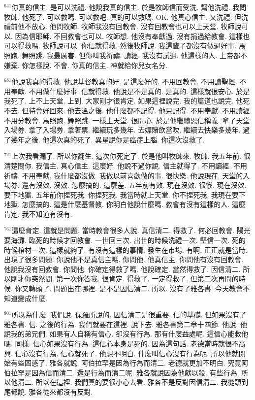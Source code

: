 \documentclass{book}
\begin{document}
$^{641}$你真的信主.
是可以洗禮.
他說我真的信主.
於是牧師信而受洗.
幫他洗禮.
我問牧師.
他死了.
可以救嗎.
可以救吧.
真的可以救嗎.
OK.
他真心信主.
又洗禮.
但洗禮前他不放心.
他問牧師.
牧師我沒有回教會.
沒有回教會也可以上天堂.
牧師說可以.
因為信耶穌.
不回教會也可以.
牧師想.
他沒有奉獻過.
沒有捐過給教會.
這樣也可以得救嗎.
牧師說可以.
你信就得救.
然後牧師說.
我這輩子都沒有做過好事.
馬照跑.
舞照跳.
我最厲害.
但你叫我祈禱.
讀經.
我沒有試過.
他這樣的人.
上帝都不嫌棄.
你怎樣說.
不會.
你真的信主.
神就給你兒女名分.

$^{681}$他說我真的得救.
他說基督教真的好.
是這麼好的.
不用回教會.
不用讀聖經.
不用奉獻.
不用做什麼好事.
信就得救.
他說是不是真的.
是真的.
這樣就很安心.
於是我死了.
上不上天堂.
上到.
大家剛才很肯定.
如果這裡說完.
我的篇道也說完.
他死不去.
但待會好回來.
他去溫之後.
他什麼都不記得.
他只記得.
不用奉獻.
不用讀經.
不用分教會.
馬照跑.
舞照跳.
一樣上天堂.
很開心.
於是他繼續恩信稱義.
拿了天堂入場券.
拿了入場券.
拿著票.
繼續玩多幾年.
去嫖賭飲當吹.
繼續去快樂多幾年.
過了幾年之後.
他這次真的死了.
異星說你是癌症上腦.
你這次沒救了.

$^{721}$上次我看漏了.
所以你翻生.
這次你死定了.
於是他叫牧師來.
牧師.
我五年前.
很清楚問你.
我信主.
真心信主.
這麼好.
他說不過你說.
信主就得了.
不用讀經.
不用祈禱.
不用奉獻.
我什麼都沒做.
我做以前喜歡做的事.
很快樂.
他說現在.
天堂的入場券.
還有沒效.
沒效.
怎麼搞的.
這麼差.
五年前有效.
現在沒效.
很慘.
現在沒效.
要下地獄.
五年前你捏死我.
你捏死我.
我當時就上天堂.
你不捏死我.
我現在要下地獄.
怎麼搞的.
這是什麼基督教.
你明白他說什麼嗎.
教會有沒有這樣的人.
這麼肯定.
我不知道有沒有.

$^{761}$這麼肯定.
這就是問題.
當時教會很多人說.
真信清二.
得救了.
何必回教會.
陽光要海灘.
臨死的時候才回教會.
一世回三次.
出世的時候洗禮一次.
堅信一次.
死的時候棺材一次.
這樣就夠了.
有沒有這樣的事情.
發生在市場.
有啊.
正正就是當時.
出現了很多問題.
你說他不是真信主嗎.
你問他.
他真信主.
你問他有沒有回教會.
他說我沒有回教會.
你問他.
你確定得救了嗎.
他說確定.
當然得救了.
因信清二.
所以剛才你突然間.
第一次你答我.
很肯定.
得救了.
一定得救了.
但第二次再問的時候.
你又轉頭了.
問題出在哪裡.
是不是因信清二.
所以.
沒有了雅各書.
今天教會不知道變成什麼.

$^{801}$所以為什麼.
我們說.
保羅所說的.
因信清二是很重要.
信的基礎.
但如果沒有了雅各書.
信.
之後的行為.
我們就要在這裡.
說下去.
雅各書第二章十四節.
他說.
他說我的弟兄們.
如果有人自稱有信心.
卻沒有行為.
那有什麼益處呢.
這信心能救他嗎.
同樣.
信心如果沒有行為.
這信心本身是死的.
因為這句話.
老德當時就很不高興.
信心沒有行為.
信心就死了.
他想不明白.
什麼叫信心沒有行為呢.
所以他就開始有些困惑了.
雅各就說.
阿伯拉罕是因為行為而清二.
老德就更加不明白.
究竟阿伯拉罕是因為信而清二.
還是行為而清二呢.
雅各就說因為他獻以殺.
有些行為.
所以他清二.
所以在這裡.
我們真的要很小心去看.
雅各不是反對因信清二.
我從頭到尾都說.
雅各從來都沒有反對.
\end{document}
